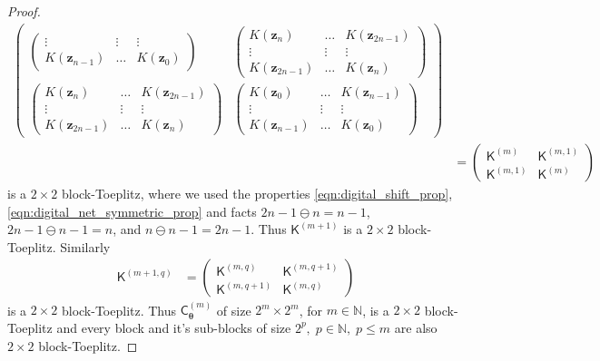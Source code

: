 \documentclass{iitthesis}          %
\newcommand{\bm}[1]{\boldsymbol{#1}}
\newcommand{\naturals}{\mathbb{N}}
\newcommand{\vtheta}{{\bm{\theta}}}
\newcommand{\vz}{\bm{z}}
\newcommand{\mC}{\mathsf{C}}
\newcommand{\mK}{\mathsf{K}}
\begin{document}
\begin{proof}
\begin{align*}
\begin{pmatrix}
\begin{pmatrix}
\vdots          & \vdots &    \vdots     \\
K(\vz_{ n-1  }) & \hdots & K(\vz_{ 0 })
\end{pmatrix}
& 
\begin{pmatrix}
K(\vz_{ n})     & \hdots & K(\vz_{ 2n-1}) \\
\vdots          & \vdots &     \vdots     \\
K(\vz_{ 2n-1 }) & \hdots & K(\vz_{ n })   
\end{pmatrix}
\\
\begin{pmatrix}
K(\vz_{ n})     & \hdots & K(\vz_{ 2n-1}) \\
\vdots          & \vdots &     \vdots     \\
K(\vz_{ 2n-1 }) & \hdots & K(\vz_{ n })   
\end{pmatrix}
&
\begin{pmatrix}
K(\vz_{  0   }) & \hdots & K(\vz_{ n-1}) \\
\vdots          & \vdots &    \vdots     \\
K(\vz_{ n-1  }) & \hdots & K(\vz_{ 0 })
\end{pmatrix}
\end{pmatrix} 
\\
& =
\begin{pmatrix}
\mK^{(m)} & \mK^{(m,1)} \\ \mK^{(m,1)} & \mK^{(m)}
\end{pmatrix}
\end{align*}
is a $2\times 2$ block-Toeplitz, where we used the properties  \eqref{eqn:digital_shift_prop}, \eqref{eqn:digital_net_symmetric_prop} and facts $2n-1 \ominus n = n-1$, $2n-1 \ominus n-1 = n$, and $n \ominus n-1 = 2n-1$. 
Thus $\mK^{(m+1)}$ is a $2\times2$ block-Toeplitz. 
Similarly 
\begin{align*}
\mK^{(m+1,q)} 
& =
\begin{pmatrix}
\mK^{(m,q)} & \mK^{(m,q+1)} \\ \mK^{(m,q+1)} & \mK^{(m,q)}
\end{pmatrix}
\end{align*}
 is a $2\times2$ block-Toeplitz. 
Thus $\mC_{\vtheta}^{(m)}$ of size $2^m\times 2^m$, for $m \in \naturals$, is a $2\times2$ block-Toeplitz and every block and it's sub-blocks of size $2^p, \; p \in \naturals, \; p \le m$ are also $2\times2$ block-Toeplitz.
\end{proof}

\end{document}
